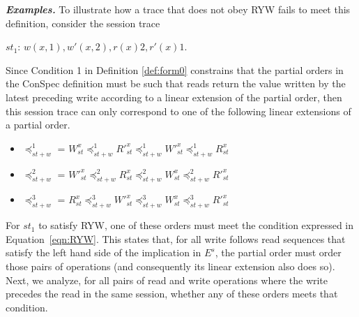 \documentclass[journal,compsoc]{IEEEtran}
\begin{document}
  
\noindent \emph{\textbf{Examples.}}
To illustrate how a trace that does not obey RYW fails to meet this definition, consider the
session trace 

$\mathit{st}_1$: $w(x,1), w'(x,2), r(x){2}, r'(x){1}$. 


Since Condition 1 in Definition \ref{def:form0} constrains that the partial orders in the ConSpec definition must be such that reads return the value written by the latest preceding write according to a linear extension of the partial order, then this session trace can only correspond to one of the following linear extensions of a partial order. \begin{itemize}
 \item $\preccurlyeq_{\mathit{st}+w}^1$ = $W^x_{\mathit{st}} \preccurlyeq_{\mathit{st}+w}^1 R'^x_{\mathit{st}} \preccurlyeq_{\mathit{st}+w}^1 W'^x_{\mathit{st}}
  \preccurlyeq_{\mathit{st}+w}^1 R^x_{\mathit{st}}$
  \item $\preccurlyeq_{\mathit{st}+w}^2$ = $W'^x_{\mathit{st}} \preccurlyeq_{\mathit{st}+w}^2 R^x_{\mathit{st}} \preccurlyeq_{\mathit{st}+w}^2 W^x_{\mathit{st}} \preccurlyeq_{\mathit{st}+w}^2 R'^x_{\mathit{st}}$
  \item $\preccurlyeq_{\mathit{st}+w}^3$ = $R^x_{\mathit{st}} \preccurlyeq_{\mathit{st}+w}^3 W'^x_{\mathit{st}} \preccurlyeq_{\mathit{st}+w}^3 W^x_{\mathit{st}} \preccurlyeq_{\mathit{st}+w}^3 R'^x_{\mathit{st}}$
  \end{itemize}
 For $\mathit{st}_1$ to satisfy RYW, one of these orders must meet the condition expressed in Equation~\ref{eqn:RYW}. This  states that, for all write follows read sequences that satisfy the left hand side of the implication in $E^{s}$, the partial order must order those pairs of operations (and consequently its linear extension also does so). Next, we analyze, for all pairs of read and write operations where the write precedes the read in the same session, whether any of these orders meets that condition.
 
\end{document}
